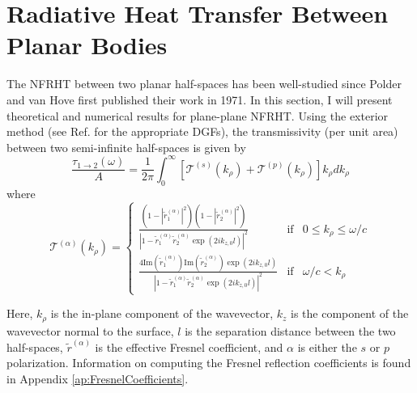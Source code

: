\section{Radiative Heat Transfer Between Planar Bodies} \label{sec:NFRHT_planeplane}
%
The NFRHT between two planar half-spaces has been well-studied since Polder and van Hove first published their work in 1971.\cite{Polder1971} In this section, I will present theoretical and numerical results for plane-plane NFRHT. Using the exterior method (see Ref.  for the appropriate DGFs), the transmissivity (per unit area) between two semi-infinite half-spaces is given by 
%
\begin{equation}
\frac{\tau_{1 \rightarrow 2}(\omega)}{A} = \frac{1}{2\pi} \int_{0}^{\infty} \left[ \mathcal{T}^{(s)}(k_{\rho}) + \mathcal{T}^{(p)}(k_{\rho}) \right] k_{\rho} dk_{\rho}
\end{equation}
%
where
\begin{equation}
\mathcal{T}^{(\alpha)}(k_{\rho}) = \left\{ \begin{array}{lcc}
\frac{\left( 1 - \left| \widetilde{r}_{1}^{(\alpha)} \right|^{2} \right) \left( 1 - \left| \widetilde{r}_{2}^{(\alpha)} \right|^{2} \right)}{\left| 1 - \widetilde{r}_{1}^{(\alpha)} \widetilde{r}_{2}^{(\alpha)} \exp{\left( 2ik_{z,0} l \right)} \right|^{2}} & \mathrm{if} & 0 \le k_{\rho} \le \omega/c \\
\frac{4 \mathrm{Im}\left( \widetilde{r}_{1}^{(\alpha)} \right) \mathrm{Im}\left( \widetilde{r}_{2}^{(\alpha)} \right) \exp{\left( 2ik_{z,0} l \right)}}{\left| 1 - \widetilde{r}_{1}^{(\alpha)} \widetilde{r}_{2}^{(\alpha)} \exp{\left( 2ik_{z,0} l \right)} \right|^{2}} & \mathrm{if} & \omega/c < k_{\rho}
\end{array} \right.
\end{equation}
%

Here, $k_{\rho}$ is the in-plane component of the wavevector, $k_{z}$ is the component of the wavevector normal to the surface, $l$ is the separation distance between the two half-spaces, $\widetilde{r}^{(\alpha)}$ is the effective Fresnel coefficient, and $\alpha$ is either the $s$ or $p$ polarization. Information on computing the Fresnel reflection coefficients is found in Appendix \ref{ap:FresnelCoefficients}.

